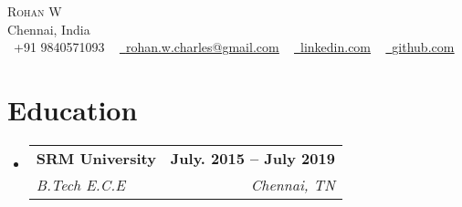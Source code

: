 \documentclass[letterpaper,10pt]{article}
\makeatletter
\newcommand{\resumeSubheading}[4]{
  \vspace{-2pt}\item
    \begin{tabular*}{1.0\textwidth}[t]{l@{\extracolsep{\fill}}r}
      \textbf{#1} & \textbf{\small #2} \\
      \textit{\small#3} & \textit{\small #4} \\
    \end{tabular*}\vspace{-7pt}
}
\newcommand{\resumeSubHeadingListStart}{\begin{itemize}[leftmargin=0.0in, label={}]}
\newcommand{\resumeSubHeadingListEnd}{\end{itemize}}
\makeatother
\begin{document}

\begin{center}
    {\Huge \scshape Rohan W} \\ \vspace{1pt}
    Chennai, India \\ \vspace{1pt}
    \small \raisebox{-0.1\height}\faPhone\ +91 9840571093 ~ \href{mailto:rohan.w.charles@gmail.com}{\raisebox{-0.2\height}\faEnvelope\  \underline{rohan.w.charles@gmail.com}} ~ 
    \href{https://www.linkedin.com/in/rohan-winsor/}{\raisebox{-0.2\height}\faLinkedin\ \underline{linkedin.com}}  ~
    \href{https://github.com/rohanwinsor}{\raisebox{-0.2\height}\faGithub\ \underline{github.com}}
    \vspace{-8pt}
\end{center}


\section{Education}
  \resumeSubHeadingListStart
    \resumeSubheading
      {SRM University}{July. 2015 -- July 2019}
      {B.Tech E.C.E}{Chennai, TN}
  \resumeSubHeadingListEnd

\end{document}
